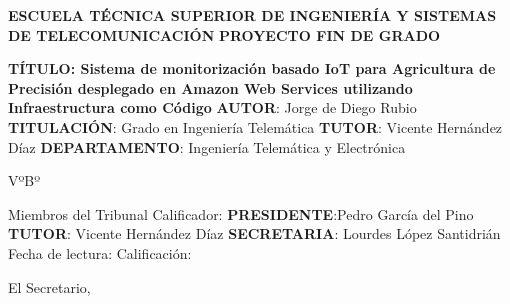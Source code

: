 \documentclass[../../memoria.tex]{subfiles}
\begin{document}
\begin{minipage}[t]{.8\textwidth}
    \bigskip
    \bigskip
    \begin{flushleft}
        \textbf{ESCUELA TÉCNICA SUPERIOR DE INGENIERÍA Y SISTEMAS DE TELECOMUNICACIÓN}
        \bigskip
        \bigskip
        \newline
        \textbf{PROYECTO FIN DE GRADO}
        \bigskip
        \bigskip
        \newline

    \end{flushleft}

    \begin{flushleft}
        \textbf{TÍTULO: Sistema de monitorización basado IoT para Agricultura de Precisión desplegado en Amazon Web Services utilizando Infraestructura como Código}
        \bigskip
        \bigskip
        \bigskip
        \newline
        \textbf{AUTOR}: Jorge de Diego Rubio
        \bigskip
        \newline
        \textbf{TITULACIÓN}:  Grado en Ingeniería Telemática
        \bigskip
        \newline
        \bigskip
        \newline
        \textbf{TUTOR}: Vicente Hernández Díaz
        \bigskip
        \newline
        \textbf{DEPARTAMENTO}: Ingeniería Telemática y Electrónica
    \end{flushleft}

    \begin{flushright}
        \bigskip
        VºBº
    \end{flushright}

    \begin{flushleft}
        \bigskip
        Miembros del Tribunal Calificador:
        \bigskip
        \bigskip
        \newline
        \textbf{PRESIDENTE}:Pedro García del Pino
        \bigskip
        \newline
        \textbf{TUTOR}: Vicente Hernández Díaz
        \bigskip
        \newline
        \textbf{SECRETARIA}: Lourdes López Santidrián
        \bigskip
        \bigskip
        \bigskip
        \newline
        Fecha de lectura:
        \bigskip
        \bigskip
        \bigskip
        \newline
        Calificación:
    \end{flushleft}

    \begin{flushright}
        \bigskip
        \bigskip
        El Secretario,
    \end{flushright}

\end{minipage}%
\end{document}
